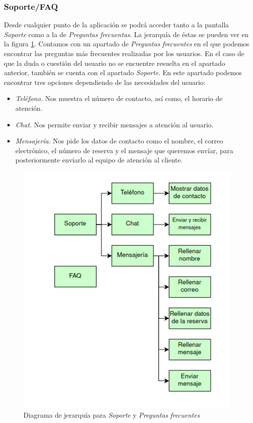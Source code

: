 \subsubsection{Soporte/FAQ}

Desde cualquier punto de la aplicación se podrá acceder tanto a la pantalla \textit{Soporte} como
a la de \textit{Preguntas frecuentas}. La jerarquía de éstas se pueden ver en la figura \ref{fig:jerarquias4}.
Contamos con un apartado de \textit{Preguntas frecuentes} en el que podemos encontrar las preguntas
más frecuentes realizadas por los usuarios. En el caso de que la duda o cuestión del usuario no se
encuentre resuelta en el apartado anterior, también se cuenta con el apartado \textit{Soporte}. En
este apartado podemos encontrar tres opciones dependiendo de las necesidades del usuario:

\begin{itemize}
      \item \textit{Teléfono.} Nos muestra el número de contacto, así como, el horario de
            atención.
      \item \textit{Chat.} Nos permite enviar y recibir mensajes a atención al usuario.
      \item \textit{Mensajería.} Nos pide los datos de contacto como el nombre, el correo
            electrónico, el número de reserva y el mensaje que queremos envíar, para posteriormente
            enviarlo al equipo de atención al cliente.
\end{itemize}

\begin{figure}
      \centering
      \includegraphics[width=0.8\linewidth]{./Imagenes/jerarquia-soporte.png}
      \caption{Diagrama de jerarquía para \textit{Soporte} y \textit{Preguntas frecuentes}}
      \label{fig:jerarquias4}
\end{figure}

